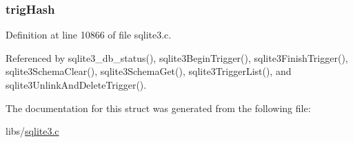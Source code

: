 \hypertarget{struct_schema_acf95030df2de6addfbc5ae894c7a9b67}{}
\subsubsection[{trig\+Hash}]{ trig\+Hash}\label{struct_schema_acf95030df2de6addfbc5ae894c7a9b67}


Definition at line 10866 of file sqlite3.\+c.



Referenced by sqlite3\+\_\+db\+\_\+status(), sqlite3\+Begin\+Trigger(), sqlite3\+Finish\+Trigger(), sqlite3\+Schema\+Clear(), sqlite3\+Schema\+Get(), sqlite3\+Trigger\+List(), and sqlite3\+Unlink\+And\+Delete\+Trigger().



The documentation for this struct was generated from the following file\+:\begin{DoxyCompactItemize}
\item 
libs/\hyperlink{sqlite3_8c}{sqlite3.\+c}\end{DoxyCompactItemize}
